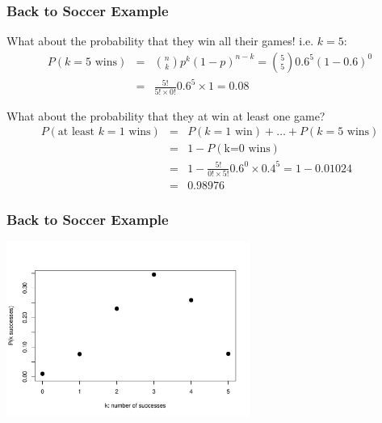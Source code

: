 \documentclass[handout]{beamer}
\begin{document}
\begin{frame}
\frametitle{Back to Soccer Example}
What about the probability that they win all their games!  i.e. $k=5$:
\pause \begin{eqnarray*}
P(\mbox{$k=5$ wins}) &=& {n \choose k} p^k (1-p)^{n-k} = {5 \choose 5} 0.6^5 (1-0.6)^{0}\\
&=& \frac{5!}{5!\times 0!} 0.6^5 \times 1 = 0.08
\end{eqnarray*}

\vspace{0.75cm}

\pause What about the probability that they at win at least one game?
\pause \begin{eqnarray*}
P(\mbox{at least $k=1$ wins}) &=& P(\mbox{$k=1$ win}) + \ldots + P(\mbox{$k=5$ wins}) \\
&=& 1 - P(\mbox{k=0 wins})\\
&=& 1 -  \frac{5!}{0!\times 5!} 0.6^0 \times 0.4^5 = 1 - 0.01024\\
&=& 0.98976
\end{eqnarray*}


\end{frame}


\begin{frame}
\frametitle{Back to Soccer Example}

\begin{center}
\includegraphics[width=8cm]{figure/bin.pdf}
\end{center}

\end{frame}
\end{document}

